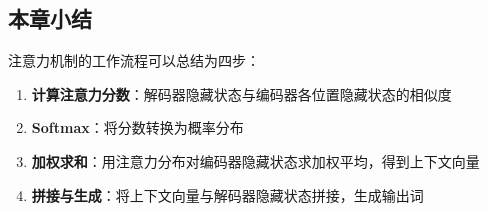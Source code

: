 \subsection{本章小结}

注意力机制的工作流程可以总结为四步：
\begin{enumerate}
    \item \textbf{计算注意力分数}：解码器隐藏状态与编码器各位置隐藏状态的相似度
    \item \textbf{Softmax}：将分数转换为概率分布
    \item \textbf{加权求和}：用注意力分布对编码器隐藏状态求加权平均，得到上下文向量
    \item \textbf{拼接与生成}：将上下文向量与解码器隐藏状态拼接，生成输出词
\end{enumerate}



